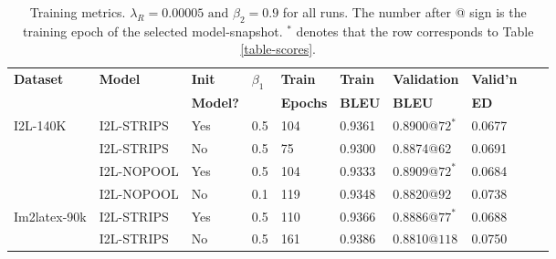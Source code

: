 \documentclass{article}
\begin{document}
\begin{table}[!hbtp]
	\caption{Training metrics. $\lambda_R=0.00005 \text{~and~} \beta_2 = 0.9$ for all runs. The number after @ sign is the training epoch of the selected model-snapshot. $^*$ denotes that the row corresponds to Table \ref{table-scores}.}
	\begin{tabular}{lll|lll|llll}
		\hline
		\textbf{Dataset} & \textbf{Model} & \textbf{Init}  &\textbf{$\beta_1$}  & \textbf{Train}  & \textbf{Train} & \textbf{Validation}  & \textbf{Valid'n}\\%
		                 &                & \textbf{Model?}&                    & \textbf{Epochs} & \textbf{BLEU}  & \textbf{BLEU}        & \textbf{ED}        \\%
		\hline 
		I2L-140K    & I2L-STRIPS & Yes & 0.5 & 104 & 0.9361 & 0.8900@$72^*$ & 0.0677 \\%
				    & I2L-STRIPS & No  & 0.5 & 75  & 0.9300 & 0.8874@$62$   & 0.0691 \\%
					& I2L-NOPOOL & Yes & 0.5 & 104 & 0.9333 & 0.8909@$72^*$ & 0.0684 \\%
					& I2L-NOPOOL & No  & 0.1 & 119 & 0.9348 & 0.8820@$92$   & 0.0738 \\%
		\hline
		Im2latex-90k& I2L-STRIPS & Yes & 0.5 & 110 & 0.9366 & 0.8886@$77^*$ & 0.0688 \\%
		            & I2L-STRIPS & No  & 0.5 & 161 & 0.9386 & 0.8810@$118$  & 0.0750 \\%
		\hline
	\end{tabular}
	\centering
	\label{table-training1}
\end{table}
\end{document}
